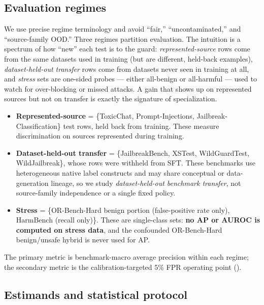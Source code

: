\documentclass[11pt]{article}
\begin{document}
\subsection{Evaluation regimes}
\label{subsec:regimes}

We use precise regime terminology and avoid ``fair,'' ``uncontaminated,'' and ``source-family OOD.'' Three regimes partition evaluation. The intuition is a spectrum of how ``new'' each test is to the guard: \emph{represented-source} rows come from the same datasets used in training (but are different, held-back examples), \emph{dataset-held-out transfer} rows come from datasets never seen in training at all, and \emph{stress} sets are one-sided probes --- either all-benign or all-harmful --- used to watch for over-blocking or missed attacks. A gain that shows up on represented sources but not on transfer is exactly the signature of specialization.

\begin{itemize}
  \item \textbf{Represented-source} = \{ToxicChat, Prompt-Injections, Jailbreak-Classification\} test rows, held back from training. These measure discrimination on sources represented during training.
  \item \textbf{Dataset-held-out transfer} = \{JailbreakBench, XSTest, WildGuardTest, WildJailbreak\}, whose rows were withheld from SFT. These benchmarks use heterogeneous native label constructs and may share conceptual or data-generation lineage, so we study \emph{dataset-held-out benchmark transfer}, not source-family independence or a single fixed policy.
  \item \textbf{Stress} = \{OR-Bench-Hard benign portion (false-positive rate only), HarmBench (recall only)\}. These are single-class sets: \textbf{no AP or AUROC is computed on stress data}, and the confounded OR-Bench-Hard benign/unsafe hybrid is never used for AP.
\end{itemize}

The primary metric is benchmark-macro average precision within each regime; the secondary metric is the calibration-targeted 5\% FPR operating point ().

\subsection{Estimands and statistical protocol}
\label{subsec:estimands}
\end{document}

